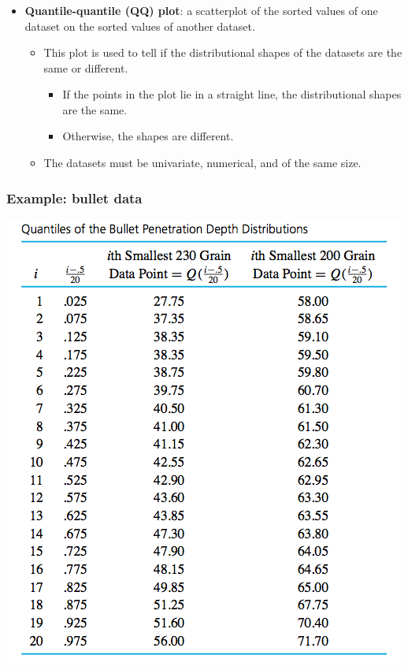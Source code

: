 \documentclass{beamer}\usepackage{graphicx, color}
\numberwithin{equation}{section}
\begin{document}
\begin{frame}
\frametitle{}
\begin{itemize}
\item {\bf Quantile-quantile (QQ) plot}: a scatterplot of the sorted values of one dataset on the sorted values of another dataset.
\begin{itemize}
\pause \item This plot is used to tell if the distributional shapes of the datasets are the same or different.
\begin{itemize}
\pause \item  If the points in the plot lie in a straight line, the distributional shapes are the same.
\pause \item Otherwise, the shapes are different.
\end{itemize}
\pause \item The datasets must be univariate, numerical, and of the same size.
\end{itemize}
\end{itemize}
\end{frame}

\begin{frame}
\frametitle{Example: bullet data}
\begin{center}
 \includegraphics{../../fig/bulletquantiles.png}
\end{center}
\end{frame}
\end{document}
